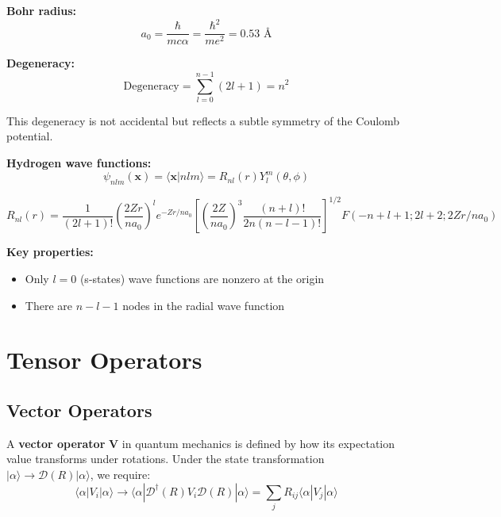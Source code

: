 \documentclass[11pt,a4paper]{article}
\begin{document}
\textbf{Bohr radius:}
\begin{equation}
\boxed{a_0 = \frac{\hbar}{mc\alpha} = \frac{\hbar^2}{me^2} = 0.53 \text{ \AA}}
\tag{3.317}
\end{equation}

\textbf{Degeneracy:}
\begin{equation}
\boxed{\text{Degeneracy} = \sum_{l=0}^{n-1}(2l+1) = n^2}
\tag{3.318}
\end{equation}

This degeneracy is not accidental but reflects a subtle symmetry of the Coulomb potential.

\textbf{Hydrogen wave functions:}
\begin{equation}
\psi_{nlm}(\mathbf{x}) = \langle\mathbf{x}|nlm\rangle = R_{nl}(r)Y_l^m(\theta, \phi)
\tag{3.319}
\end{equation}

\begin{equation}
R_{nl}(r) = \frac{1}{(2l+1)!}\left(\frac{2Zr}{na_0}\right)^l e^{-Zr/na_0}\left[\left(\frac{2Z}{na_0}\right)^3\frac{(n+l)!}{2n(n-l-1)!}\right]^{1/2} F(-n+l+1; 2l+2; 2Zr/na_0)
\tag{3.320}
\end{equation}

\textbf{Key properties:}
\begin{itemize}
\item Only $l = 0$ (s-states) wave functions are nonzero at the origin
\item There are $n - l - 1$ nodes in the radial wave function
\end{itemize}

\section{Tensor Operators}

\subsection{Vector Operators}

A \textbf{vector operator} $\mathbf{V}$ in quantum mechanics is defined by how its expectation value transforms under rotations. Under the state transformation $|\alpha\rangle \to \mathscr{D}(R)|\alpha\rangle$, we require:
\begin{equation}
\langle\alpha|V_i|\alpha\rangle \to \langle\alpha|\mathscr{D}^\dagger(R)V_i\mathscr{D}(R)|\alpha\rangle = \sum_j R_{ij}\langle\alpha|V_j|\alpha\rangle
\tag{3.445}
\end{equation}
\end{document}
